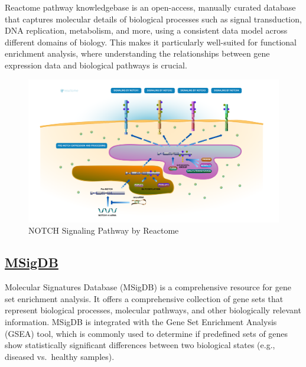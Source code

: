 \documentclass[
]{book}
\begin{document}
Reactome pathway knowledgebase is an open-access, manually curated database that captures molecular details of biological processes such as signal transduction, DNA replication, metabolism, and more, using a consistent data model across different domains of biology. This makes it particularly well-suited for functional enrichment analysis, where understanding the relationships between gene expression data and biological pathways is crucial.

\begin{figure}

{\centering \includegraphics[width=1\linewidth]{images/NOTCH_signaling_pathway_reactome} 

}

\caption{NOTCH Signaling Pathway by Reactome}\label{fig:unnamed-chunk-9}
\end{figure}

\hypertarget{msigdb}{%
\subsection{\texorpdfstring{\href{https://www.gsea-msigdb.org/}{MSigDB}}{MSigDB}}\label{msigdb}}

Molecular Signatures Database (MSigDB) is a comprehensive resource for gene set enrichment analysis. It offers a comprehensive collection of gene sets that represent biological processes, molecular pathways, and other biologically relevant information. MSigDB is integrated with the Gene Set Enrichment Analysis (GSEA) tool, which is commonly used to determine if predefined sets of genes show statistically significant differences between two biological states (e.g., diseased vs.~healthy samples).
\end{document}
